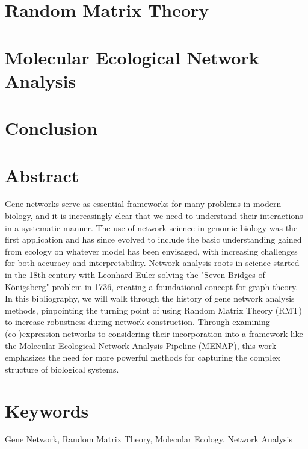 \documentclass{article}[12pt]
\begin{document}
\section{Random Matrix Theory}\label{sec:random-matrix-theory}


\section{Molecular Ecological Network Analysis}\label{sec:molecular-ecological-network-analysis}


\section{Conclusion}\label{sec:conclusion}

\newpage
\printbibliography
{}

\newpage
\section*{Abstract}\label{sec:abstract}

Gene networks serve as essential frameworks for many problems in modern biology, and it is increasingly clear that we need to understand their interactions in a systematic manner.
The use of network science in genomic biology was the first application and has since evolved to include the basic understanding gained from ecology on whatever model has been envisaged, with increasing challenges for both accuracy and interpretability.
Network analysis roots in science started in the 18th century with Leonhard Euler solving the "Seven Bridges of Königsberg" problem in 1736, creating a foundational concept for graph theory.
In this bibliography, we will walk through the history of gene network analysis methods, pinpointing the turning point of using Random Matrix Theory (RMT) to increase robustness during network construction.
Through examining (co-)expression networks to considering their incorporation into a framework like the Molecular Ecological Network Analysis Pipeline (MENAP), this work emphasizes the need for more powerful methods for capturing the complex structure of biological systems.

\vfill %

\section*{Keywords}
\noindent Gene Network, Random Matrix Theory, Molecular Ecology, Network Analysis
\end{document}
